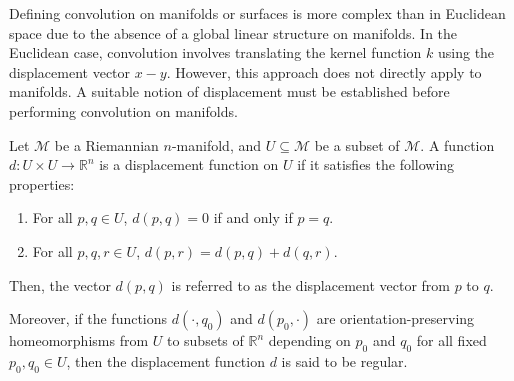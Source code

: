 Defining convolution on manifolds or surfaces is more complex than in Euclidean space due to the absence of a global linear structure on manifolds. In the Euclidean case, convolution involves translating the kernel function $k$ using the displacement vector $x - y$. However, this approach does not directly apply to manifolds. A suitable notion of displacement must be established before performing convolution on manifolds.

\begin{definition}
    Let $\mathcal{M}$ be a Riemannian $n$-manifold, and $U \subseteq \mathcal{M}$ be a subset of $\mathcal{M}$. A function $d: U\times U \to \mathbb{R}^n$ is a displacement function on $U$ if it satisfies the following properties:
    \begin{enumerate}
        \item For all $p, q \in U$, $d(p,q) = 0$ if and only if $p=q$.
        \item For all $p, q, r \in U$, $d(p,r) = d(p,q) + d(q,r)$.
    \end{enumerate}
    Then, the vector $d(p, q)$ is referred to as the displacement vector from $p$ to $q$.
    
    Moreover, if the functions $d(\cdot, q_0)$ and $d(p_0, \cdot)$ are orientation-preserving homeomorphisms from $U$ to subsets of $\mathbb{R}^n$ depending on $p_0$ and $q_0$ for all fixed $p_0, q_0 \in U$, then the displacement function $d$ is said to be regular.
\end{definition}


